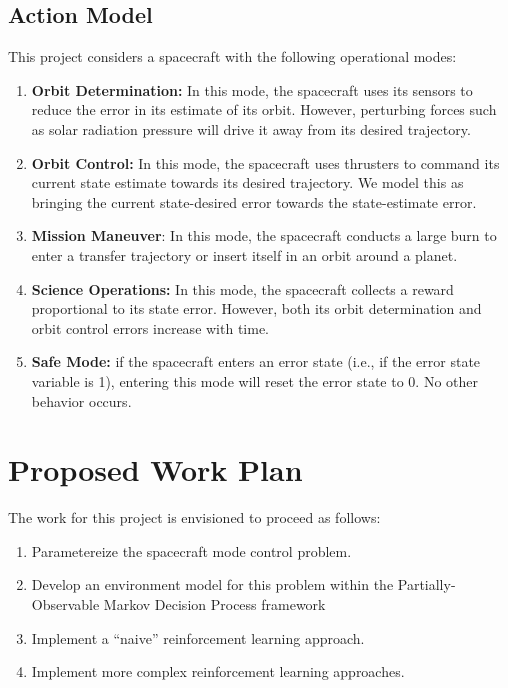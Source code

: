 \documentclass[]{article}
\begin{document}
\subsection{Action Model}
This project considers a spacecraft with the following operational modes:
\begin{enumerate}
	\item \textbf{Orbit Determination:} In this mode, the spacecraft uses its sensors to reduce the error in its estimate of its orbit. However, perturbing forces such as solar radiation pressure will drive it away from its desired trajectory.
	
	\item \textbf{Orbit Control:} In this mode, the spacecraft uses thrusters to command its current state estimate towards its desired trajectory. We model this as bringing the current state-desired error towards the state-estimate error. 
	
	\item \textbf{Mission Maneuver}: In this mode, the spacecraft conducts a large burn to enter a transfer trajectory or insert itself in an orbit around a planet. 
	
	\item \textbf{Science Operations:} In this mode, the spacecraft collects a reward proportional to its state error. However, both its orbit determination and orbit control errors increase with time.
	
	\item \textbf{Safe Mode:} if the spacecraft enters an error state (i.e., if the error state variable is 1), entering this mode will reset the error state to 0. No other behavior occurs. 
\end{enumerate}

\section{Proposed Work Plan}

The work for this project is envisioned to proceed as follows:
\begin{enumerate}
	\item Parametereize the spacecraft mode control problem.
	\item Develop an environment model for this problem within the Partially-Observable Markov Decision Process framework
	\item Implement a ``naive'' reinforcement learning approach.
	\item Implement more complex reinforcement learning approaches.
\end{enumerate}
	
\end{document}
